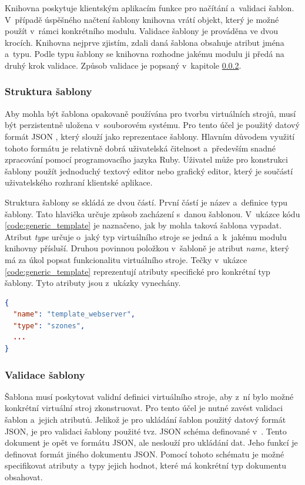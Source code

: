 Knihovna poskytuje klientským aplikacím funkce pro načítání a~validaci šablon. V~případě úspěšného načtení šablony
knihovna vrátí objekt, který je možné použít v~rámci konkrétního modulu. Validace šablony je prováděna ve dvou
krocích. Knihovna nejprve zjistím, zdali daná šablona obsahuje atribut jména a~typu. Podle typu šablony se knihovna rozhodne
jakému modulu ji předá na druhý krok validace. Způsob validace je popsaný v~kapitole \ref{chapter:implementation:library:generic:validation}.
\subsubsection{Struktura šablony}
\label{chapter:implementation:library:generic:structure}
Aby mohla být šablona opakovaně používána pro tvorbu virtuálních strojů, musí být perzistentně uložena v~souborovém systému.
Pro tento účel je použitý datový formát JSON \cite{json}, který slouží jako reprezentace šablony. Hlavním důvodem využití tohoto
formátu je relativně dobrá uživatelská čitelnost a~především snadné zpracování pomocí programovacího jazyka Ruby. Uživatel
může pro konstrukci šablony použít jednoduchý textový editor nebo grafický editor, který je součástí uživatelského rozhraní
klientské aplikace. 

Struktura šablony se skládá ze dvou částí. První částí je název a~definice typu šablony. Tato hlavička určuje
způsob zacházení s~danou šablonou. V~ukázce kódu \ref{code:generic_template} je naznačeno, jak by mohla taková šablona vypadat.
Atribut \textit{type} určuje o~jaký typ virtuálního stroje se jedná a~k~jakému modulu knihovny přísluší. Druhou povinnou položkou
v~šabloně je atribut \textit{name}, který má za úkol popsat funkcionalitu virtuálního stroje. Tečky v~ukázce
\ref{code:generic_template} reprezentují atributy specifické pro konkrétní typ šablony. Tyto atributy jsou z~ukázky vynechány.
\begin{lstlisting}[language=json, caption={Generická šablona}, float,label={code:generic_template}]  
{
  "name": "template_webserver",
  "type": "szones",
  ...
}
\end{lstlisting}
\subsubsection{Validace šablony}
\label{chapter:implementation:library:generic:validation}
Šablona musí poskytovat validní definici virtuálního stroje, aby z~ní bylo možné konkrétní virtuální stroj zkonstruovat.
Pro tento účel je nutné zavést validaci šablon a~jejich atributů. Jelikož je pro ukládání šablon použitý datový formát JSON,
je pro validaci šablony použité tvz. JSON schéma definované v~\cite{json:schema}. Tento dokument je opět ve formátu
JSON, ale neslouží pro ukládání dat. Jeho funkcí je definovat formát jiného dokumentu JSON. Pomocí tohoto schématu
je možné specifikovat atributy a~typy jejich hodnot, které má konkrétní typ dokumentu obsahovat.

